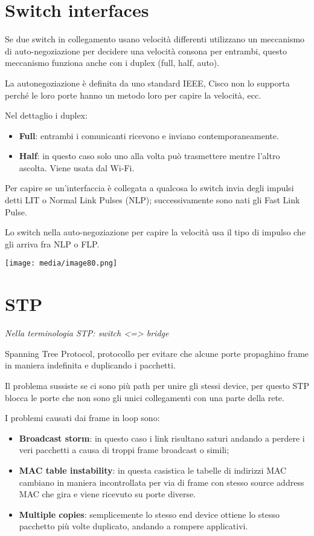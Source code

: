 \section{Switch interfaces}\label{switch-interfaces}

Se due switch in collegamento usano velocità differenti utilizzano un
meccanismo di auto-negoziazione per decidere una velocità consona per
entrambi, questo meccanismo funziona anche con i duplex (full, half,
auto).

La autonegoziazione è definita da uno standard IEEE, Cisco non lo
supporta perché le loro porte hanno un metodo loro per capire la
velocità, ecc.

Nel dettaglio i duplex:

\begin{itemize}
\item
  \textbf{Full}: entrambi i comunicanti ricevono e inviano
  contemporaneamente.
\item
  \textbf{Half}: in questo caso solo uno alla volta può trasmettere
  mentre l'altro ascolta. Viene usata dal Wi-Fi.
\end{itemize}

Per capire se un'interfaccia è collegata a qualcosa lo switch invia
degli impulsi detti LIT o Normal Link Pulses (NLP); successivamente sono
nati gli Fast Link Pulse.

Lo switch nella auto-negoziazione per capire la velocità usa il tipo di
impulso che gli arriva fra NLP o FLP.

\texttt{[image: media/image80.png]}

\section{STP}\label{stp}

\emph{Nella terminologia STP: switch \textless=\textgreater{} bridge}

Spanning Tree Protocol, protocollo per evitare che alcune porte
propaghino frame in maniera indefinita e duplicando i pacchetti.

Il problema sussiste se ci sono più path per unire gli stessi device,
per questo STP blocca le porte che non sono gli unici collegamenti con
una parte della rete.

I problemi causati dai frame in loop sono:

\begin{itemize}
\item
  \textbf{Broadcast storm}: in questo caso i link risultano saturi
  andando a perdere i veri pacchetti a causa di troppi frame broadcast o
  simili;
\item
  \textbf{MAC table instability}: in questa casistica le tabelle di
  indirizzi MAC cambiano in maniera incontrollata per via di frame con
  stesso source address MAC che gira e viene ricevuto su porte diverse.
\item
  \textbf{Multiple copies}: semplicemente lo stesso end device ottiene
  lo stesso pacchetto più volte duplicato, andando a rompere
  applicativi.
\end{itemize}

